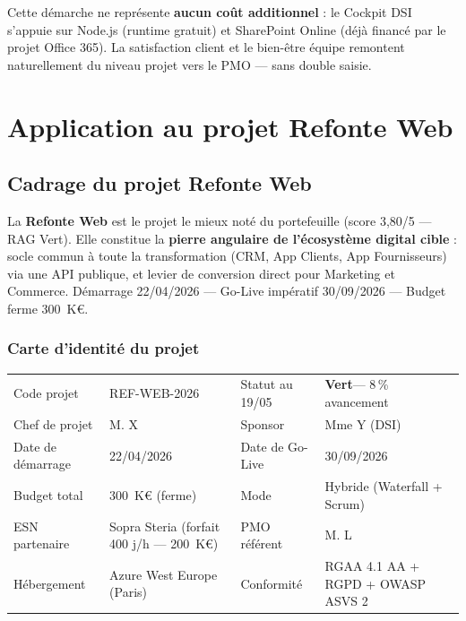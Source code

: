 \documentclass[11pt,a4paper,oneside]{report}
\newcommand{\ragV}{\cellcolor{cnGreen!20}\textbf{\textcolor{cnGreen}{Vert}}}
\begin{document}
\begin{reco}
Cette démarche ne représente \textbf{aucun coût additionnel} : le Cockpit DSI s'appuie sur Node.js (runtime gratuit) et SharePoint Online (déjà financé par le projet Office 365). La satisfaction client et le bien-être équipe remontent naturellement du niveau projet vers le PMO --- sans double saisie.
\end{reco}

\newpage

\part{Application au projet Refonte Web}

\chapter{Cadrage du projet Refonte Web}

\begin{finding}
La \textbf{Refonte Web} est le projet le mieux noté du portefeuille (score 3{,}80/5 --- RAG Vert). Elle constitue la \textbf{pierre angulaire de l'écosystème digital cible} : socle commun à toute la transformation (CRM, App Clients, App Fournisseurs) via une API publique, et levier de conversion direct pour Marketing et Commerce. Démarrage 22/04/2026 --- Go-Live impératif 30/09/2026 --- Budget ferme 300~K€.
\end{finding}

\section{Carte d'identité du projet}

\renewcommand{\arraystretch}{1.5}
\begin{tabularx}{\textwidth}{L{4cm} Y L{4cm} Y}
\toprule
{} &  &  &  \\
\midrule
Code projet      & REF-WEB-2026                & Statut au 19/05  & \ragV --- 8\,\% avancement \\
Chef de projet   & M. X                        & Sponsor          & Mme Y (DSI) \\
Date de démarrage & 22/04/2026                 & Date de Go-Live  & 30/09/2026 \\
Budget total     & 300~K€ (ferme)              & Mode             & Hybride (Waterfall + Scrum) \\
ESN partenaire   & Sopra Steria (forfait 400 j/h --- 200~K€) & PMO référent     & M. L \\
Hébergement      & Azure West Europe (Paris)   & Conformité       & RGAA 4.1 AA + RGPD + OWASP ASVS 2 \\
\bottomrule
\end{tabularx}
\end{document}
